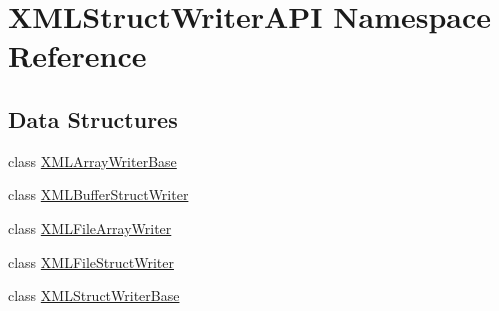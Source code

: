 \hypertarget{namespaceXMLStructWriterAPI}{}\section{X\+M\+L\+Struct\+Writer\+A\+PI Namespace Reference}
\label{namespaceXMLStructWriterAPI}
\subsection*{Data Structures}
\begin{DoxyCompactItemize}
\item 
class \mbox{\hyperlink{classXMLStructWriterAPI_1_1XMLArrayWriterBase}{X\+M\+L\+Array\+Writer\+Base}}
\item 
class \mbox{\hyperlink{classXMLStructWriterAPI_1_1XMLBufferStructWriter}{X\+M\+L\+Buffer\+Struct\+Writer}}
\item 
class \mbox{\hyperlink{classXMLStructWriterAPI_1_1XMLFileArrayWriter}{X\+M\+L\+File\+Array\+Writer}}
\item 
class \mbox{\hyperlink{classXMLStructWriterAPI_1_1XMLFileStructWriter}{X\+M\+L\+File\+Struct\+Writer}}
\item 
class \mbox{\hyperlink{classXMLStructWriterAPI_1_1XMLStructWriterBase}{X\+M\+L\+Struct\+Writer\+Base}}
\end{DoxyCompactItemize}

